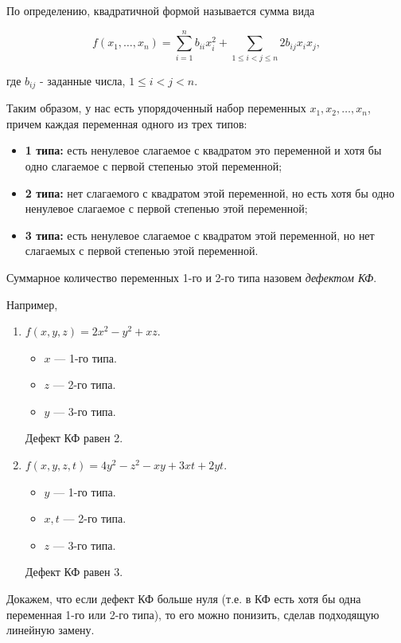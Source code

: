 По определению, квадратичной формой называется сумма вида

$$f(x_1, \ldots, x_n) = \sum_{i=1}^n b_{ii}x_i^2 + \sum_{1 \leq i < j \leq n} 2b_{ij}x_ix_j,$$

где $b_{ij}$ - заданные числа, $1 \leq i < j < n$.

Таким образом, у нас есть упорядоченный набор переменных $x_1, x_2, \ldots, x_n$, причем каждая переменная одного из трех типов:

\begin{itemize}
    \item \textbf{1 типа:} есть ненулевое слагаемое с квадратом это переменной и хотя бы одно слагаемое с первой степенью этой переменной;
    \item \textbf{2 типа:} нет слагаемого с квадратом этой переменной, но есть хотя бы одно ненулевое слагаемое с первой степенью этой переменной;
    \item \textbf{3 типа:} есть ненулевое слагаемое с квадратом этой переменной, но нет слагаемых с первой степенью этой переменной.
\end{itemize}

Суммарное количество переменных 1-го и 2-го типа назовем \textit{дефектом КФ}.

Например, 

\begin{enumerate}
    \item $f(x, y, z) = 2x^2 - y^2 + xz$.

    \begin{itemize}[nosep]
        \item $x$ — 1-го типа.
        \item $z$ — 2-го типа.
        \item $y$ — 3-го типа.
    \end{itemize}
    Дефект КФ равен 2.

    \item $f(x, y, z, t) = 4y^2-z^2-xy+3xt+2yt$.

    \begin{itemize}[nosep]
        \item $y$ — 1-го типа.
        \item $x, t$ — 2-го типа.
        \item $z$ — 3-го типа.
    \end{itemize}
    Дефект КФ равен 3.
\end{enumerate}

Докажем, что если дефект КФ больше нуля (т.е. в КФ есть хотя бы одна переменная 1-го или 2-го типа), то его можно понизить, сделав подходящую линейную замену.


